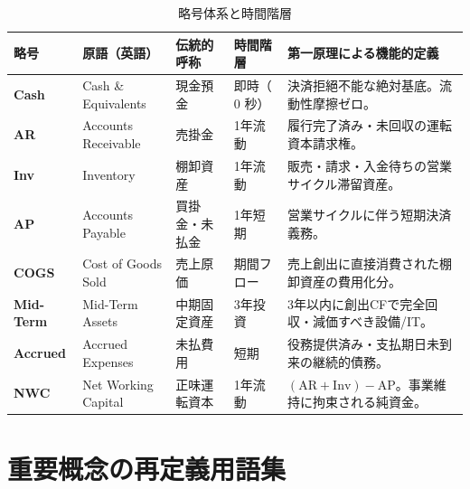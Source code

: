 \documentclass[11pt, a4paper]{report}
\begin{document}
\begin{table}[htbp]
\centering
\small
\begin{tabular}{llllp{6.8cm}}
\toprule
\textbf{略号} & \textbf{原語（英語）} & \textbf{伝統的呼称} & \textbf{時間階層} & \textbf{第一原理による機能的定義} \\
\midrule
\textbf{Cash} & Cash \& Equivalents & 現金預金 & 即時（$0$ 秒） & 決済拒絕不能な絶対基底。流動性摩擦ゼロ。 \\
\textbf{AR} & Accounts Receivable & 売掛金 & 1年流動 & 履行完了済み・未回収の運転資本請求権。 \\
\textbf{Inv} & Inventory & 棚卸資産 & 1年流動 & 販売・請求・入金待ちの営業サイクル滞留資産。 \\
\textbf{AP} & Accounts Payable & 買掛金・未払金 & 1年短期 & 営業サイクルに伴う短期決済義務。 \\
\textbf{COGS} & Cost of Goods Sold & 売上原価 & 期間フロー & 売上創出に直接消費された棚卸資産の費用化分。 \\
\textbf{Mid-Term} & Mid-Term Assets & 中期固定資産 & 3年投資 & 3年以内に創出CFで完全回収・減価すべき設備/IT。 \\
\textbf{Accrued} & Accrued Expenses & 未払費用 & 短期 & 役務提供済み・支払期日未到来の継続的債務。 \\
\textbf{NWC} & Net Working Capital & 正味運転資本 & 1年流動 & $(\text{AR} + \text{Inv}) - \text{AP}$。事業維持に拘束される純資金。 \\
\bottomrule
\end{tabular}
\caption{略号体系と時間階層}
\end{table}

\section{重要概念の再定義用語集}
\end{document}
